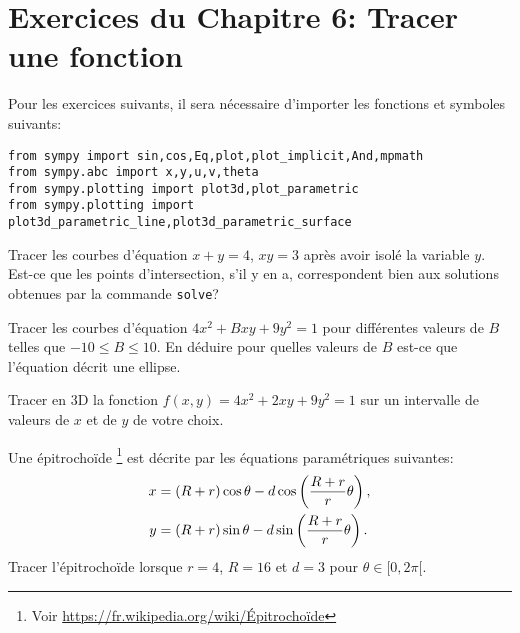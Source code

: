 

\section*{Exercices du Chapitre 6: Tracer une fonction}

Pour les exercices suivants, il sera nécessaire d'importer les fonctions
et symboles suivants:
\begin{verbatim}
from sympy import sin,cos,Eq,plot,plot_implicit,And,mpmath
from sympy.abc import x,y,u,v,theta
from sympy.plotting import plot3d,plot_parametric
from sympy.plotting import plot3d_parametric_line,plot3d_parametric_surface
\end{verbatim}

\begin{exercice}
    Tracer les courbes d'équation $x+y=4$, $xy=3$ après avoir isolé la variable
    $y$. Est-ce que les points d'intersection, s'il y en a, correspondent bien aux
    solutions obtenues par la commande \texttt{solve}?
\end{exercice}

\begin{exercice}
    Tracer les courbes d'équation $4x^2+Bxy+9y^2=1$ pour différentes valeurs de
    $B$ telles que $-10\leq B\leq 10$. En déduire pour quelles valeurs de $B$
    est-ce que l'équation décrit une ellipse.
\end{exercice}

\begin{exercice}
Tracer en 3D la fonction $f(x,y) = 4x^2+2xy+9y^2=1$ sur un intervalle de valeurs
de $x$ et de $y$ de votre choix.
\end{exercice}

\begin{exercice}
Une épitrochoïde \footnote{Voir \url{https://fr.wikipedia.org/wiki/Épitrochoïde}}
est décrite par les équations paramétriques suivantes:
\begin{align*}
    x &= (R + r)\cos\theta - d\cos\left({R + r \over r}\theta\right),\\
    y &= (R + r)\sin\theta - d\sin\left({R + r \over r}\theta\right).
\end{align*}
Tracer l'épitrochoïde lorsque $r=4$, $R=16$ et $d=3$ pour $\theta\in[0,2\pi[$.
\end{exercice}

